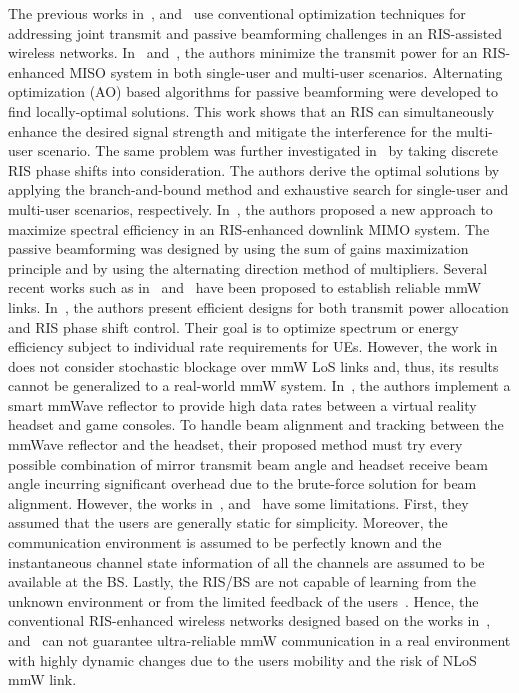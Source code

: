 \documentclass[conference]{IEEEtran}
\begin{document}
The previous works in~\cite{Abari2018,Huang2018,58,91}, and~\cite{102} use conventional optimization techniques for addressing joint transmit and passive beamforming challenges in an RIS-assisted wireless networks. In~\cite{58} and~\cite{91}, the authors minimize the transmit power for an RIS-enhanced MISO system in both single-user and multi-user scenarios. Alternating optimization (AO) based algorithms for passive beamforming were developed to find locally-optimal solutions. This work shows that an RIS can simultaneously enhance the desired signal strength and mitigate the interference for the multi-user scenario. The same problem was further investigated in~\cite{91} by taking discrete RIS phase shifts into consideration. The authors derive the optimal solutions by applying the branch-and-bound method and exhaustive search for single-user and multi-user scenarios, respectively. In~\cite{102}, the authors proposed a new approach to maximize spectral efficiency in an RIS-enhanced downlink MIMO system. The passive beamforming was designed by using the sum of gains maximization principle and by using the alternating direction method of multipliers. Several recent works such as in~\cite{Abari2018} and~\cite{Huang2018} have been proposed to establish reliable mmW links. In~\cite{Huang2018}, the authors present efficient designs for both transmit power allocation and RIS phase shift control. Their goal is to optimize spectrum or energy efficiency subject to individual rate requirements for UEs. However, the work in~\cite{Huang2018} does not consider stochastic blockage over mmW LoS links and, thus, its results cannot be generalized to a real-world mmW system. In~\cite{Abari2018}, the authors implement a smart mmWave reflector to provide high data rates between a virtual reality headset and game consoles. To handle beam alignment and tracking between the mmWave reflector and the headset, their proposed method must try every possible combination of mirror transmit beam angle and headset receive beam angle incurring significant overhead due to the brute-force solution for beam alignment. However, the works in~\cite{Abari2018,Huang2018,58,91}, and~\cite{102} have some limitations. First, they assumed that the users are generally static for simplicity. Moreover, the communication environment is assumed to be perfectly known and the instantaneous channel state information of all the channels are assumed to be available at the BS. Lastly, the RIS/BS are not capable of learning from the unknown environment or from the limited feedback of the users~\cite{9424177}. Hence, the conventional RIS-enhanced wireless networks designed based on the works in~\cite{Abari2018,Huang2018,58,91}, and~\cite{102} can not guarantee ultra-reliable mmW communication in a real environment with highly dynamic changes due to the users mobility and the risk of NLoS mmW link.
\end{document}
